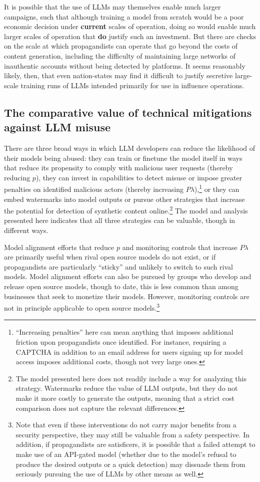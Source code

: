 \documentclass{article}
\begin{document}
It is possible that the use of LLMs may themselves enable much larger campaigns, such that although training a model from scratch would be a poor economic decision under \textbf{current} scales of operation, doing so would enable much larger scales of operation that \textbf{do} justify such an investment. But there are checks on the scale at which propagandists can operate that go beyond the costs of content generation, including the difficulty of maintaining large networks of inauthentic accounts without being detected by platforms. \cite{goldsteinpanel, sedova1} It seems reasonably likely, then, that even nation-states may find it difficult to justify secretive large-scale training runs of LLMs intended primarily for use in influence operations. 

\subsection{The comparative value of technical mitigations against LLM misuse}

There are three broad ways in which LLM developers can reduce the likelihood of their models being abused: they can train or finetune the model itself in ways that reduce its propensity to comply with malicious user requests (thereby reducing $p$), they can invest in capabilities to detect misuse or impose greater penalties on identified malicious actors (thereby increasing $P\lambda$),\footnote{``Increasing penalties'' here can mean anything that imposes additional friction upon propagandists once identified. For instance, requiring a CAPTCHA in addition to an email address for users signing up for model access imposes additional costs, though not very large ones.} or they can embed watermarks into model outputs or pursue other strategies that increase the potential for detection of synthetic content online.\footnote{The model presented here does not readily include a way for analyzing this strategy. Watermarks reduce the value of LLM outputs, but they do not make it more costly to generate the outputs, meaning that a strict cost comparison does not capture the relevant differences.} The model and analysis presented here indicates that all three strategies can be valuable, though in different ways.

Model alignment efforts that reduce $p$ and monitoring controls that increase $P\lambda$ are primarily useful when rival open source models do not exist, or if propagandists are particularly ``sticky'' and unlikely to switch to such rival models. Model alignment efforts can also be pursued by groups who develop and release open source models, though to date, this is less common than among businesses that seek to monetize their models. However, monitoring controls are not in principle applicable to open source models.\footnote{Note that even if these interventions do not carry major benefits from a security perspective, they may still be valuable from a safety perspective. In addition, if propagandists are satisficers, it is possible that a failed attempt to make use of an API-gated model (whether due to the model's refusal to produce the desired outputs or a quick detection) may dissuade them from seriously pursuing the use of LLMs by other means as well.}
\end{document}
